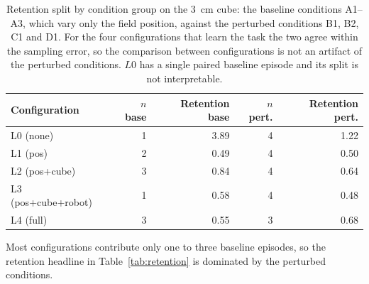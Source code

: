 \begin{table}[h]
\centering
\caption{Retention split by condition group on the 3~cm cube: the baseline conditions A1--A3, which vary only the field position, against the perturbed conditions B1, B2, C1 and D1. For the four configurations that learn the task the two agree within the sampling error, so the comparison between configurations is not an artifact of the perturbed conditions. $L0$ has a single paired baseline episode and its split is not interpretable.}
\label{tab:condition_split}
\begin{tabular}{lrrrr}
\hline
\textbf{Configuration} & \textbf{$n$ base} & \textbf{Retention base} & \textbf{$n$ pert.} & \textbf{Retention pert.} \\
\hline
L0 (none) & 1 & 3.89 & 4 & 1.22 \\
L1 (pos) & 2 & 0.49 & 4 & 0.50 \\
L2 (pos+cube) & 3 & 0.84 & 4 & 0.64 \\
L3 (pos+cube+robot) & 1 & 0.58 & 4 & 0.48 \\
L4 (full) & 3 & 0.55 & 3 & 0.68 \\
\hline
\end{tabular}

\vspace{2pt}
\begin{minipage}{0.95\linewidth}
\footnotesize Most configurations contribute only one to three baseline episodes, so the retention headline in Table~\ref{tab:retention} is dominated by the perturbed conditions.
\end{minipage}
\end{table}
